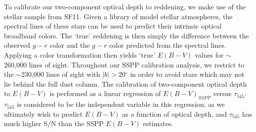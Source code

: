\documentclass{emulateapj}
\begin{document}

\begin{figure*}
\begin{center}
\caption{\label{fig:resid} (top left) Residuals of $E(B-V)_{2comp}$ relative to
$E(B-V)_{SSPP}$ as a function of $E(B-V)_{SFD}$. The grayscale represents the 
conditional probability within each $E(B-V)_{SFD}$ bin. The central black line 
shows the moving median. The upper and lower black lines represent the moving 
75th and 25th percentiles respectively. (bottom left) Residuals of 
$E(B-V)_{2comp}$ relative to $E(B-V)_{SSPP}$ as a function of hot dust 
temperature $T_2$. (top right) Same as top left, but illustrating the residuals
of $E(B-V)_{mbb}$, our calibration of the \cite{planckdust} $\tau_{353}$ to 
$E(B-V)_{SSPP}$. (bottom right)  Same as bottom left, but showing the 
$E(B-V)_{mbb}$ residuals as a function of the single-MBB dust temperature from 
\cite{planckdust}. The temperature axes always range from the 
0.4$^{th}$ percentile to 99.6$^{th}$ percentile temperature values.}
\end{center}
\end{figure*}

To calibrate our two-component optical depth to reddening, we make use of the 
stellar sample from SF11. Given a library of model stellar atmospheres, the 
spectral lines of these stars can be used to predict their intrinsic optical 
broadband colors. The `true' reddening is then simply the difference between 
the observed $g-r$ color and the $g-r$ color predicted from the spectral lines.
Applying a color transformation then yields `true' $E(B-V)$ values for 
$\sim$260,000 lines of sight. Throughout our SSPP calibration analysis, we 
restrict to the $\sim$230,000 lines of sight with $|b|$$>$20$^{\circ}$ in order
to avoid stars which may not lie behind the full dust column. The calibration 
of two-component optical depth to $E(B-V)$ is performed as a linear regression 
of $E(B-V)_{SSPP}$ versus $\tau_{545}$. $\tau_{545}$ is considered to be the 
independent variable in this regression, as we ultimately wish to predict 
$E(B-V)$ as a function of optical depth, and $\tau_{545}$ has much higher S/N 
than the SSPP $E(B-V)$ estimates.

\end{document}
